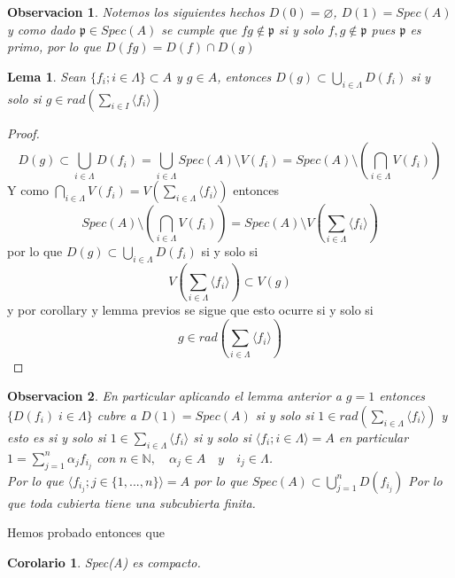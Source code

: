 \documentclass{article}
\newtheorem{corollary}{Corolario}
\newtheorem{lemma}{Lema}
\newtheorem{observation}{Observacion}
\begin{document}
\begin{observation}
    Notemos los siguientes hechos $D(0)=\varnothing$,
    $D(1)=Spec(A)$ y como dado $\mathfrak{p} \in Spec(A)$ se cumple
    que $fg \notin \mathfrak{p}$ si y solo $f,g \notin \mathfrak{p}$
    pues $\mathfrak{p}$ es primo, por lo que $D(fg)= D(f)\cap D(g)$
\end{observation}

\begin{lemma}
    Sean $\{f_i; i\in \Lambda\} \subset A$ y $g \in A$,
    entonces $D(g)\subset \bigcup_{i\in \Lambda}D(f_i) $ si y solo si
    $g \in rad \left( \sum_{i\in I} \langle f_i \rangle\right)$
\end{lemma}
\begin{proof}
    $$D(g) \subset \bigcup_{i\in \Lambda}D(f_i) = \bigcup_{i\in  \Lambda} Spec(A)\setminus V(f_i)
    = Spec(A)\setminus \left( \bigcap_{i\in  \Lambda}V(f_i)\right) $$
    Y como $\bigcap_{i\in  \Lambda}V(f_i) = V(\sum_{i\in \Lambda}\langle f_i \rangle)$
    entonces $$Spec(A)\setminus \left(\bigcap_{i\in  \Lambda}V(f_i) \right) = Spec(A)\setminus V\left(\sum_{i\in \Lambda}\langle f_i \rangle\right)$$
    por lo que $D(g)\subset \bigcup_{i \in \Lambda}D(f_i)$ si y solo si
    $$V\left(\sum_{i\in \Lambda}\langle f_i \rangle \right) \subset V(g)$$
    y por corollary y lemma previos se sigue que esto ocurre si y solo si
    $$g \in rad \left(\sum_{i\in \Lambda}\langle f_i \rangle\right)$$
\end{proof}

\begin{observation}
    En particular aplicando el lemma anterior a 
    $g = 1$ entonces $\{D(f_i)\; i\in \Lambda\}$ 
    cubre a $D(1) = Spec(A)$ si y solo si $1 \in rad(\sum_{i\in \Lambda} \langle f_i \rangle)$
    y esto es si y solo si $1\in \sum_{i\in \Lambda} \langle f_i \rangle$
    si y solo si $\langle f_i; i\in \Lambda \rangle = A$
    en particular $1 = \sum_{j=1}^{n} \alpha_j f_{i_j}$ con $n\in \mathbb{N}, \quad \alpha_j \in A \quad y \quad i_j \in \Lambda$.\\
    Por lo que $\langle f_{i_j}; j\in\{1,...,n \} \rangle = A$
    por lo que $Spec(A) \subset \bigcup_{j=1}^{n}D(f_{i_j})$
    Por lo que toda cubierta tiene una subcubierta finita.
\end{observation}

Hemos probado entonces que 

\begin{corollary}
    Spec(A) es compacto.
\end{corollary}
\end{document}
